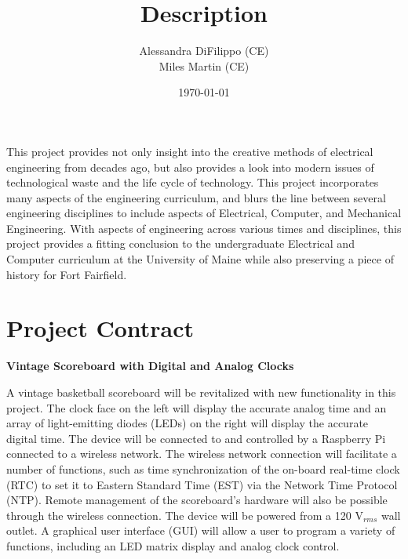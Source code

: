 \documentclass[11pt]{article}
\begin{document}
This project provides not only insight into the creative methods of electrical engineering from decades ago, but also provides a look into modern issues of technological waste and the life cycle of technology. 
This project incorporates many aspects of the engineering curriculum, and blurs the line between several engineering disciplines to include aspects of Electrical, Computer, and Mechanical Engineering. 
With aspects of engineering across various times and disciplines, this project provides a fitting conclusion to the undergraduate Electrical and Computer curriculum at the University of Maine while also preserving a piece of history for Fort Fairfield.


\newpage
\appendix
\titlespacing*{\section}{0pt}{0pt}{-8pt}

\section{Project Contract}
\label{appendix:contract}
\setlength{\parskip}{0.5em}

\singlespacing
\LARGE{{ \textbf{Vintage Scoreboard with Digital and Analog Clocks }}}\\
\large{\author{Alessandra DiFilippo (CE) \\ 
Miles Martin (CE) }
\date{\today}}

\setlength{\parskip}{0.5em}

\title{\textbf{Description}}

A vintage basketball scoreboard will be revitalized with new functionality in this project. 
The clock face on the left will display the accurate analog time and an array of light-emitting diodes (LEDs) on the right will display the accurate digital time. 
The device will be connected to and controlled by a Raspberry Pi connected to a wireless network. 
The wireless network connection will facilitate a number of functions, such as time synchronization of the on-board real-time clock (RTC) to set it to Eastern Standard Time (EST) via the Network Time Protocol (NTP). 
Remote management of the scoreboard's hardware will also be possible through the wireless connection.
The device will be powered from a 120 V$_{rms}$ wall outlet. 
A graphical user interface (GUI) will allow a user to program a variety of functions, including an LED matrix display and analog clock control.
\end{document}
